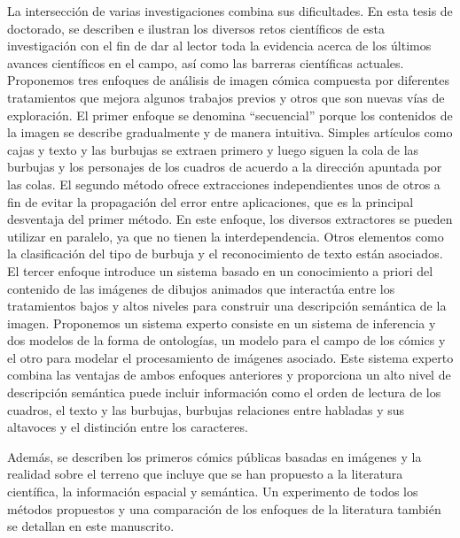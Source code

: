 La intersección de varias investigaciones combina sus dificultades.
En esta tesis de doctorado, se describen e ilustran los diversos retos científicos de esta investigación con el fin de dar al lector toda la evidencia acerca de los últimos avances científicos en el campo, así como las barreras científicas actuales.
Proponemos tres enfoques de análisis de imagen cómica compuesta por diferentes tratamientos que mejora algunos trabajos previos y otros que son nuevas vías de exploración.
El primer enfoque se denomina ``secuencial'' porque los contenidos de la imagen se describe gradualmente y de manera intuitiva.
Simples artículos como cajas y texto y las burbujas se extraen primero y luego siguen la cola de las burbujas y los personajes de los cuadros de acuerdo a la dirección apuntada por las colas.
El segundo método ofrece extracciones independientes unos de otros a fin de evitar la propagación del error entre aplicaciones, que es la principal desventaja del primer método.
En este enfoque, los diversos extractores se pueden utilizar en paralelo, ya que no tienen la interdependencia.
Otros elementos como la clasificación del tipo de burbuja y el reconocimiento de texto están asociados.
El tercer enfoque introduce un sistema basado en un conocimiento a priori del contenido de las imágenes de dibujos animados que interactúa entre los tratamientos bajos y altos niveles para construir una descripción semántica de la imagen.
Proponemos un sistema experto consiste en un sistema de inferencia y dos modelos de la forma de ontologías, un modelo para el campo de los cómics y el otro para modelar el procesamiento de imágenes asociado.
Este sistema experto combina las ventajas de ambos enfoques anteriores y proporciona un alto nivel de descripción semántica puede incluir información como el orden de lectura de los cuadros, el texto y las burbujas, burbujas relaciones entre habladas y sus altavoces y el distinción entre los caracteres.

Además, se describen los primeros cómics públicas basadas en imágenes y la realidad sobre el terreno que incluye que se han propuesto a la literatura científica, la información espacial y semántica.
Un experimento de todos los métodos propuestos y una comparación de los enfoques de la literatura también se detallan en este manuscrito.

\clearpage\thispagestyle{empty}